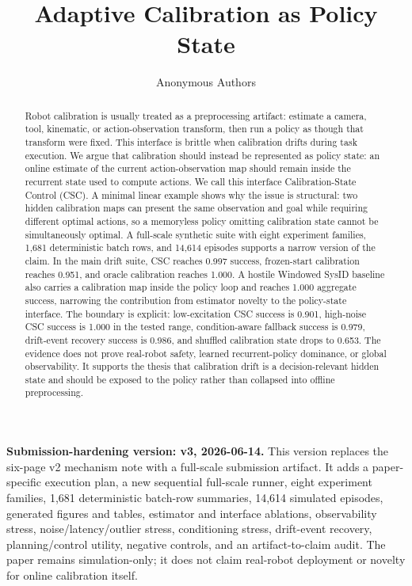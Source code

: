 \documentclass{article}
\title{Adaptive Calibration as Policy State}
\author{Anonymous Authors}
\begin{document}
\maketitle

\noindent\textbf{Submission-hardening version: v3, 2026-06-14.}
This version replaces the six-page v2 mechanism note with a full-scale
submission artifact. It adds a paper-specific execution plan, a new sequential
full-scale runner, eight experiment families, 1,681 deterministic batch-row
summaries, 14,614 simulated episodes, generated figures and tables, estimator
and interface ablations, observability stress, noise/latency/outlier stress,
conditioning stress, drift-event recovery, planning/control utility, negative
controls, and an artifact-to-claim audit. The paper remains simulation-only; it
does not claim real-robot deployment or novelty for online calibration itself.

\begin{abstract}
Robot calibration is usually treated as a preprocessing artifact: estimate a
camera, tool, kinematic, or action-observation transform, then run a policy as
though that transform were fixed. This interface is brittle when calibration
drifts during task execution. We argue that calibration should instead be
represented as policy state: an online estimate of the current
action-observation map should remain inside the recurrent state used to compute
actions. We call this interface Calibration-State Control (CSC). A minimal
linear example shows why the issue is structural: two hidden calibration maps
can present the same observation and goal while requiring different optimal
actions, so a memoryless policy omitting calibration state cannot be
simultaneously optimal. A full-scale synthetic suite with eight experiment
families, 1,681 deterministic batch rows, and 14,614 episodes supports a narrow
version of the claim. In the main drift suite, CSC reaches 0.997 success,
frozen-start calibration reaches 0.951, and oracle calibration reaches 1.000.
A hostile Windowed SysID baseline also carries a calibration map inside the
policy loop and reaches 1.000 aggregate success, narrowing the contribution
from estimator novelty to the policy-state interface. The boundary is explicit:
low-excitation CSC success is 0.901, high-noise CSC success is 1.000 in the
tested range, condition-aware fallback success is 0.979, drift-event recovery
success is 0.986, and shuffled calibration state drops to 0.653. The evidence
does not prove real-robot safety, learned recurrent-policy dominance, or global
observability. It supports the thesis that calibration drift is a
decision-relevant hidden state and should be exposed to the policy rather than
collapsed into offline preprocessing.
\end{abstract}
\end{document}
